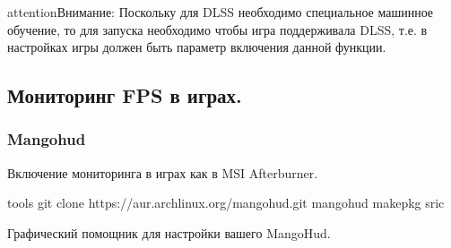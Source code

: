 \documentclass[letterpaper,10pt,russian,openany]{sphinxmanual}
\begin{document}
\begin{sphinxadmonition}{attention}{Внимание:}
\sphinxAtStartPar
Поскольку для DLSS необходимо специальное машинное обучение, то для запуска необходимо чтобы игра поддерживала DLSS, т.е. в настройках игры должен быть параметр включения данной функции. 
\end{sphinxadmonition}

\ignorespaces 

\subsection{Мониторинг FPS в играх.}
\label{\detokenize{source/linux-gaming:fps}}\label{\detokenize{source/linux-gaming:fps-monitoring}}\label{\detokenize{source/linux-gaming:index-18}}
\ignorespaces 

\subsubsection{Mangohud}
\label{\detokenize{source/linux-gaming:mangohud}}\label{\detokenize{source/linux-gaming:index-19}}\label{\detokenize{source/linux-gaming:id13}}
\sphinxAtStartPar
Включение мониторинга в играх как в MSI Afterburner.


\sphinxAtStartPar
{}

\begin{sphinxVerbatim}[commandchars=\\\{\}]
 tools                                             
git clone https://aur.archlinux.org/mangohud.git     
 mangohud                                          
makepkg \PYGZhy{}sric                                        
\end{sphinxVerbatim}

\sphinxAtStartPar
Графический помощник для настройки вашего MangoHud.
\end{document}
